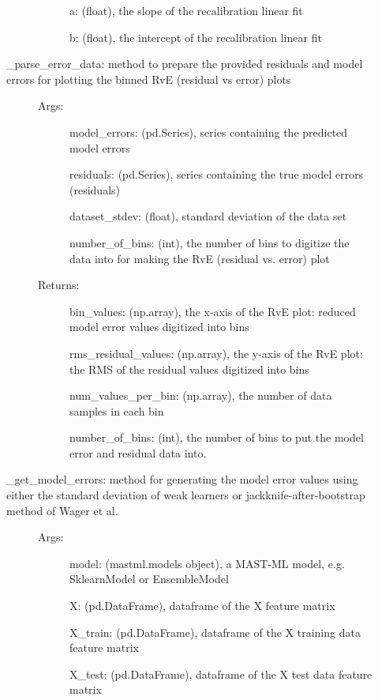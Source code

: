 \documentclass[letterpaper,10pt,english]{sphinxmanual}
\begin{document}
\begin{fulllineitems}
\begin{description}
\begin{description}
\begin{description}
a: (float), the slope of the recalibration linear fit

b: (float), the intercept of the recalibration linear fit

\end{description}

\item[{\_parse\_error\_data: method to prepare the provided residuals and model errors for plotting the binned RvE (residual vs error) plots}] \leavevmode\begin{description}
\item[{Args:}] \leavevmode
model\_errors: (pd.Series), series containing the predicted model errors

residuals: (pd.Series), series containing the true model errors (residuals)

dataset\_stdev: (float), standard deviation of the data set

number\_of\_bins: (int), the number of bins to digitize the data into for making the RvE (residual vs. error) plot

\item[{Returns:}] \leavevmode
bin\_values: (np.array), the x-axis of the RvE plot: reduced model error values digitized into bins

rms\_residual\_values: (np.array), the y-axis of the RvE plot: the RMS of the residual values digitized into bins

num\_values\_per\_bin: (np.array), the number of data samples in each bin

number\_of\_bins: (int), the number of bins to put the model error and residual data into.

\end{description}

\item[{\_get\_model\_errors: method for generating the model error values using either the standard deviation of weak learners or jackknife-after-bootstrap method of Wager et al.}] \leavevmode\begin{description}
\item[{Args:}] \leavevmode
model: (mastml.models object), a MAST-ML model, e.g. SklearnModel or EnsembleModel

X: (pd.DataFrame), dataframe of the X feature matrix

X\_train: (pd.DataFrame), dataframe of the X training data feature matrix

X\_test: (pd.DataFrame), dataframe of the X test data feature matrix


\end{description}
\end{description}
\end{description}
\end{fulllineitems}
\end{document}
